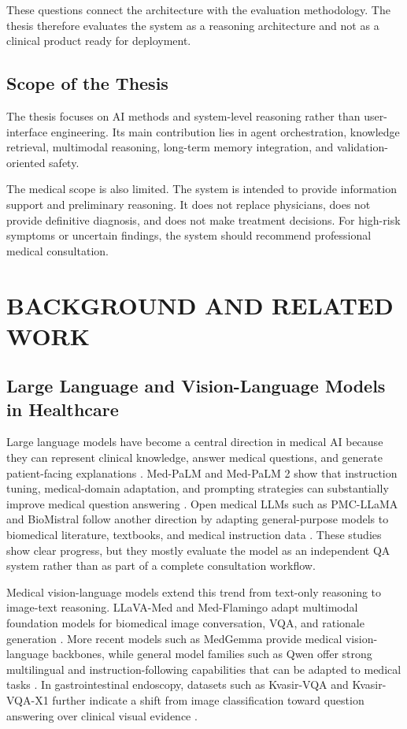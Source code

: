 These questions connect the architecture with the evaluation methodology. The thesis therefore evaluates the system as a reasoning architecture and not as a clinical product ready for deployment.

\section{Scope of the Thesis}

The thesis focuses on AI methods and system-level reasoning rather than user-interface engineering. Its main contribution lies in agent orchestration, knowledge retrieval, multimodal reasoning, long-term memory integration, and validation-oriented safety.

The medical scope is also limited. The system is intended to provide information support and preliminary reasoning. It does not replace physicians, does not provide definitive diagnosis, and does not make treatment decisions. For high-risk symptoms or uncertain findings, the system should recommend professional medical consultation.

\chapter{BACKGROUND AND RELATED WORK}

\section{Large Language and Vision-Language Models in Healthcare}

Large language models have become a central direction in medical AI because they can represent clinical knowledge, answer medical questions, and generate patient-facing explanations \cite{llm_healthcare}. Med-PaLM and Med-PaLM 2 show that instruction tuning, medical-domain adaptation, and prompting strategies can substantially improve medical question answering \cite{medpalm2}. Open medical LLMs such as PMC-LLaMA and BioMistral follow another direction by adapting general-purpose models to biomedical literature, textbooks, and medical instruction data \cite{pmc_llama,biomistral}. These studies show clear progress, but they mostly evaluate the model as an independent QA system rather than as part of a complete consultation workflow.

Medical vision-language models extend this trend from text-only reasoning to image-text reasoning. LLaVA-Med and Med-Flamingo adapt multimodal foundation models for biomedical image conversation, VQA, and rationale generation \cite{llava_med,med_flamingo}. More recent models such as MedGemma provide medical vision-language backbones, while general model families such as Qwen offer strong multilingual and instruction-following capabilities that can be adapted to medical tasks \cite{medgemma_report,qwen3_report}. In gastrointestinal endoscopy, datasets such as Kvasir-VQA and Kvasir-VQA-X1 further indicate a shift from image classification toward question answering over clinical visual evidence \cite{kvasir_vqa,kvasir_vqa_x1}.

